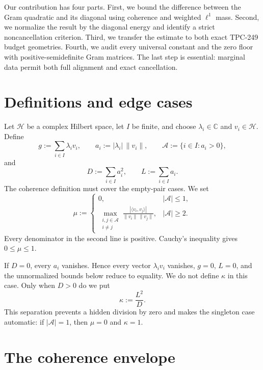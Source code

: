 \documentclass[11pt]{article}
\theoremstyle{remark}
\newcommand{\cH}{\mathcal H}
\newcommand{\A}{\mathcal A}
\begin{document}
Our contribution has four parts.  First, we bound the difference between the
Gram quadratic and its diagonal using coherence and weighted $\ell^1$ mass.
Second, we normalize the result by the diagonal energy and identify a strict
noncancellation criterion.  Third, we transfer the estimate to both exact
TPC-249 budget geometries.  Fourth, we audit every universal constant and the
zero floor with positive-semidefinite Gram matrices.  The last step is
essential: marginal data permit both full alignment and exact cancellation.

\section{Definitions and edge cases}

Let $\cH$ be a complex Hilbert space, let $I$ be finite, and choose
$\lambda_i\in\mathbb C$ and $v_i\in\cH$.  Define
\begin{equation}\label{eq:def}
 g:=\sum_{i\in I}\lambda_i v_i,\qquad
 a_i:=|\lambda_i|\,\|v_i\|,\qquad
 \A:=\{i\in I:a_i>0\},
\end{equation}
and
\begin{equation}\label{eq:DL}
 D:=\sum_{i\in I}a_i^2,\qquad L:=\sum_{i\in I}a_i.
\end{equation}
The coherence definition must cover the empty-pair cases.  We set
\begin{equation}\label{eq:mu}
 \mu:=
 \begin{cases}
  0,& |\A|\leq1,\\[2mm]
  \displaystyle\max_{\substack{i,j\in\A\\i\neq j}}
  \frac{|\langle v_i,v_j\rangle|}{\|v_i\|\,\|v_j\|},& |\A|\geq2.
 \end{cases}
\end{equation}
Every denominator in the second line is positive.  Cauchy's inequality gives
$0\leq\mu\leq1$.

If $D=0$, every $a_i$ vanishes.  Hence every vector $\lambda_i v_i$ vanishes,
$g=0$, $L=0$, and the unnormalized bounds below reduce to equality.  We do not
define $\kappa$ in this case.  Only when $D>0$ do we put
\begin{equation}\label{eq:kappa}
 \kappa:=\frac{L^2}{D}.
\end{equation}
This separation prevents a hidden division by zero and makes the singleton
case automatic: if $|\A|=1$, then $\mu=0$ and $\kappa=1$.

\section{The coherence envelope}
\end{document}
